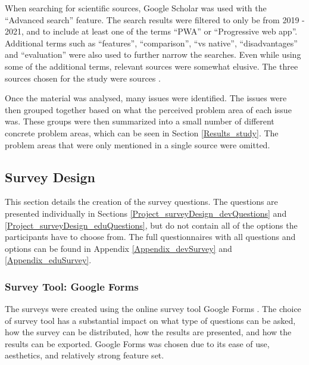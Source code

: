 \documentclass[a4paper,12pt]{article}
\begin{document}
When searching for scientific sources, Google Scholar was used with the “Advanced search” feature. The search results were filtered to only be from 2019 - 2021, and to include at least one of the terms “PWA” or “Progressive web app”. Additional terms such as “features”, “comparison”, “vs native”, “disadvantages” and “evaluation” were also used to further narrow the searches. Even while using some of the additional terms, relevant sources were somewhat elusive. The three sources chosen for the study were sources \cite{dawning_of_pwa, pwa_in_modern_webdeb, pwa_unified}.

Once the material was analysed, many issues were identified. The issues were then grouped together based on what the perceived problem area of each issue was. These groups were then summarized into a small number of different concrete problem areas, which can be seen in Section \ref{Results_study}. The problem areas that were only mentioned in a single source were omitted.

\subsection{Survey Design}
\label{Project_surveyDesign}
This section details the creation of the survey questions. The questions are presented individually in Sections \ref{Project_surveyDesign_devQuestions} and \ref{Project_surveyDesign_eduQuestions}, but do not contain all of the options the participants have to choose from. The full questionnaires with all questions and options can be found in Appendix \ref{Appendix_devSurvey} and \ref{Appendix_eduSurvey}.

\subsubsection{Survey Tool: Google Forms}
\label{Project_surveyDesign_googleForms}
The surveys were created using the online survey tool Google Forms \cite{google_forms}. The choice of survey tool has a substantial impact on what type of questions can be asked, how the survey can be distributed, how the results are presented, and how the results can be exported. Google Forms was chosen due to its ease of use, aesthetics, and relatively strong feature set.
\end{document}
